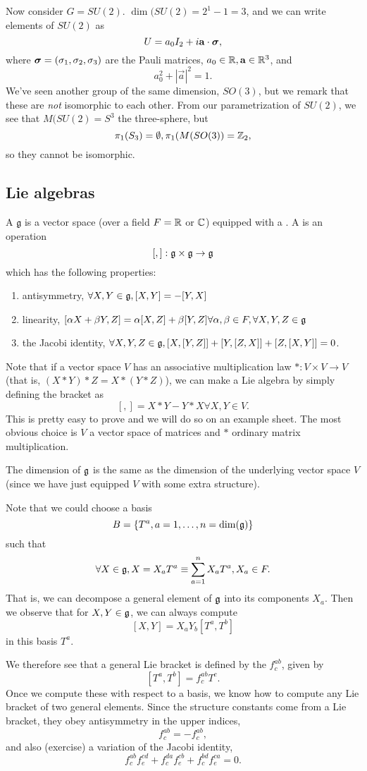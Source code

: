 \begin{exm}
Now consider $G=SU(2)$. $\dim(SU(2)=2^1-1=3$, and we can write elements of $SU(2)$ as
$$U=a_0 I_2 + i \boldsymbol{\mathbf{a}}\cdot \mbox{\boldmath$ \sigma $},$$
where $\mbox{\boldmath$ \sigma $}=(\sigma_1, \sigma_2, \sigma_3)$ are the Pauli matrices, $a_0 \in \mathbb{R}, \boldsymbol{\mathbf{a}}\in \mathbb{R}^3$, and
$$a_0^2+|\vec{a}|^2=1.$$
We've seen another group of the same dimension, $SO(3)$, but we remark that these are \emph{not} isomorphic to each other. From our parametrization of $SU(2)$, we see that $M(SU(2)=S^3$ the three-sphere, but $$\pi_1(S_3)=\emptyset, \pi_1(M(SO(3))=\mathbb{Z}_2,$$
so they cannot be isomorphic.
\end{exm}

\subsection*{Lie algebras} 
\begin{defn}
A  $\mathfrak{g}$ is a vector space (over a field $F=\mathbb{R}$ or $\mathbb{C}$) equipped with a . A  is an operation
$$[,]:\mathfrak{g} \times \mathfrak{g} \to \mathfrak{g}$$
which has the following properties:
\begin{enumerate}
\item antisymmetry, $\forall X,Y \in \mathfrak{g}, [X,Y]=-[Y,X]$
\item linearity, $[\alpha X+\beta Y, Z] = \alpha [X,Z]+\beta [Y, Z] \forall \alpha,\beta \in F, \forall X,Y,Z \in \mathfrak{g}$
\item the Jacobi identity, $\forall X,Y,Z\in \mathfrak{g}, [X,[Y,Z]]+[Y,[Z,X]]+[Z,[X,Y]]=0$.
\end{enumerate}
Note that if a vector space $V$ has an associative multiplication law $*:V\times V \to V$ (that is, $(X*Y)*Z=X*(Y*Z)$), we can make a Lie algebra by simply defining the bracket as
$$[,]=X * Y - Y* X \forall X,Y\in V.$$
This is pretty easy to prove and we will do so on an example sheet. The most obvious choice is $V$ a vector space of matrices and $*$ ordinary matrix multiplication.
\end{defn}
The dimension of $\mathfrak{g}$ is the same as the dimension of the underlying vector space $V$ (since we have just equipped $V$ with some extra structure).

Note that we could choose a basis
$$B=\{T^a, a=1,\ldots,n=\dim(\mathfrak{g})\}$$ such that
$$\forall X\in \mathfrak{g}, X = X_a T^a \equiv \sum_{a=1}^n X_a T^a, X_a \in F.$$
That is, we can decompose a general element of $\mathfrak{g}$ into its components $X_a$. Then we observe that for $X,Y\in \mathfrak{g}$, we can always compute
$$[X,Y]=X_aY_b [T^a, T^b]$$
in this basis $T^a$. 
\begin{defn}
We therefore see that a general Lie bracket is defined by the  $f^{ab}_c$, given by
$$[T^a,T^b]=f^{ab}_c T^c.$$
Once we compute these with respect to a basis, we know how to compute any Lie bracket of two general elements. Since the structure constants come from a Lie bracket, they obey antisymmetry in the upper indices, $$f^{ab}_c= -f^{ab}_c,$$
and also (exercise) a variation of the Jacobi identity,
$$f^{ab}_c f^{cd}_e +f^{da}_c f^{cb}_e+f^{bd}_c f^{ca}_e =0.$$
\end{defn}